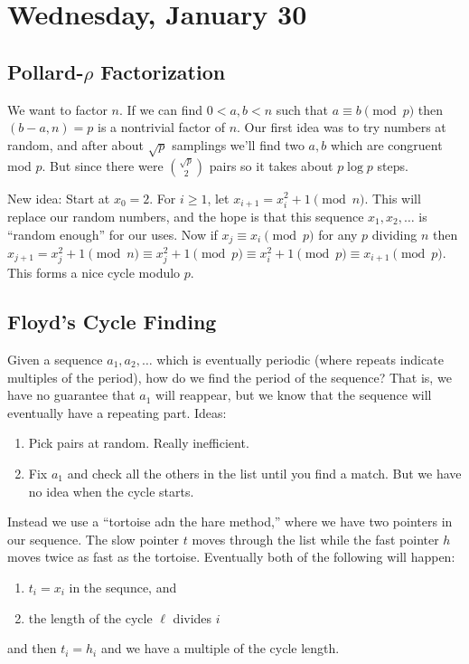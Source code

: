 
\section{Wednesday, January 30}

\subsection{Pollard-\texorpdfstring{$\rho$}{rho} Factorization}

We want to factor $n$. If we can find $0 < a,b <n$ such that $a \equiv b \pmod{p}$ then $(b-a,n)=p$ is a nontrivial factor of $n$. Our first idea was to try numbers at random, and after about $\sqrt{p}$ samplings we'll find two $a,b$ which are congruent mod $p$. But since there were ${\sqrt{p} \choose 2}$ pairs so it takes about $p\log p$ steps.

New idea: Start at $x_0 = 2$. For $i \geq 1$, let $x_{i+1} = x_i^2 + 1 \pmod{n}$. This will replace our random numbers, and the hope is that this sequence $x_1, x_2, \dotsc$ is ``random enough'' for our uses. Now if $x_j \equiv x_i \pmod{p}$ for any $p$ dividing $n$ then $x_{j+1} = x_j^2 + 1 \pmod{n} \equiv x_j^2 + 1 \pmod{p} \equiv x_i^2 + 1 \pmod{p} \equiv x_{i+1} \pmod{p}$. This forms a nice cycle modulo $p$. 

\subsection{Floyd's Cycle Finding}

Given a sequence $a_1, a_2,\dotsc$ which is eventually periodic (where repeats indicate multiples of the period), how do we find the period of the sequence? That is, we have no guarantee that $a_1$ will reappear, but we know that the sequence will eventually have a repeating part. Ideas:
\begin{enumerate}
\item Pick pairs at random. Really inefficient.
\item Fix $a_1$ and check all the others in the list until you find a match. But we have no idea when the cycle starts.
\end{enumerate}
Instead we use a ``tortoise adn the hare method,'' where we have two pointers in our sequence. The slow pointer $t$ moves through the list while the fast pointer $h$ moves twice as fast as the tortoise. Eventually both of the following will happen:
\begin{enumerate}
\item $t_i = x_i$ in the sequnce, and 
\item the length of the cycle $\ell$ divides $i$ 
\end{enumerate}
and then $t_i = h_i$ and we have a multiple of the cycle length.

